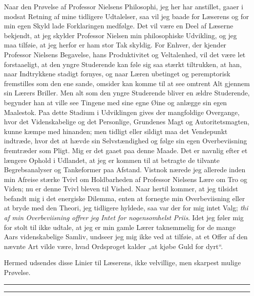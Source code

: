\documentclass[12pt,a4paper]{book}
\newcommand{\opage}[1]{\marginnote{\footnotesize\textit{[#1]}}}
\begin{document}
Naar den Prøvelse af Professor Nielsens Philosophi,
jeg her har anstillet, gaaer i modsat Retning af
mine tidligere Udtalelser, saa vil jeg baade for Læserens
og for min egen Skyld lade Forklaringen medfølge.
Det vil være en Deel af Læserne bekjendt, at jeg skylder
Professor Nielsen min philosophiske Udvikling, og jeg
maa tilføie, at jeg herfor er ham stor Tak skyldig. For
Enhver, der kjender Professor Nielsens Begavelse, hans
Produktivitet og Veltalenhed, vil det være let forstaaeligt,
at den yngre Studerende kan føle sig saa stærkt
tiltrukken, at han, naar Indtrykkene stadigt fornyes, og
\opage{98}\setcounter{footnote}{0}naar Læren ubetinget og peremptorisk fremstilles som den
ene sande, omsider kan komme til at see omtrent Alt gjennem
sin Lærers Briller. Men alt som den yngre Studerende
bliver en ældre Studerende, begynder han at ville see
Tingene med sine egne Øine og anlægge sin egen
Maalestok. Paa dette Stadium i Udviklingen gives der
mangfoldige Overgange, hvor det Videnskabelige og det
Personlige, Grundenes Magt og Autoritetsmagten, kunne
kæmpe med hinanden; men tidligt eller sildigt maa det
Vendepunkt indtræde, hvor det at hævde sin Selvstændighed
og følge sin egen Overbeviisning fremtræder som
Pligt. Mig er det gaaet paa denne Maade. Det er
navnlig efter et længere Ophold i Udlandet, at jeg
er kommen til at betragte de tilvante Begrebsanalyser
og Tankeformer paa Afstand. Vistnok nærede jeg allerede
inden min Afreise stærke Tvivl om Holdbarheden
af Professor Nielsens Lære om Tro og Viden; nu er
denne Tvivl bleven til Vished. Naar hertil kommer,
at jeg tilsidst befandt mig i det energiske Dilemma,
enten at fornegte min Overbeviisning eller at bryde med
den Theori, jeg tidligere hyldede, saa var der for mig
intet Valg; \emph{thi af min Overbeviisning offrer
jeg Intet for nogensomhelst Priis}. Idet jeg
føler mig for stolt til ikke udtale, at jeg er min gamle
Lærer taknemmelig for de mange Aars videnskabelige
Samliv, undseer jeg mig ikke ved at tilføie, at et Offer
af den nævnte Art vilde være, hvad Ordsproget kalder
„at kjøbe Guld for dyrt“.

Hermed udsendes disse Linier til Læserens, ikke
velvillige, men skarpest mulige Prøvelse.

\begin{center}\rule[2.2pt]{0.32\textwidth}{0.4pt}\hspace*{-0.32\textwidth}\rule{0.32\textwidth}{0.4pt}\end{center}
\end{document}
